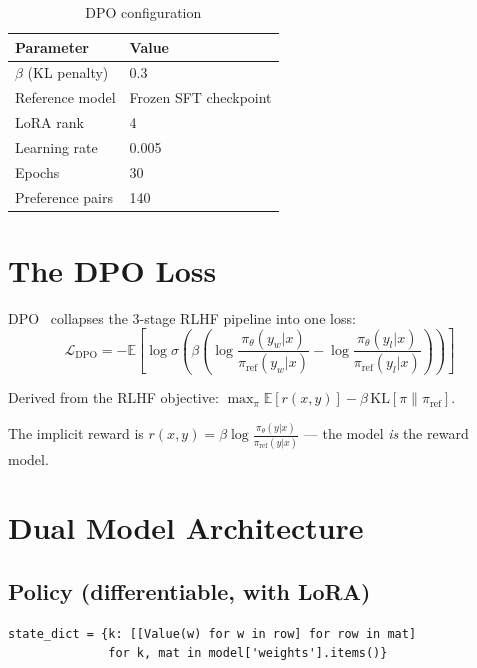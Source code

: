\documentclass[11pt,a4paper]{article}
\begin{document}
\begin{table}[h]
\centering
\begin{tabular}{ll}
\toprule
\textbf{Parameter} & \textbf{Value} \\
\midrule
$\beta$ (KL penalty) & 0.3 \\
Reference model & Frozen SFT checkpoint \\
LoRA rank & 4 \\
Learning rate & 0.005 \\
Epochs & 30 \\
Preference pairs & 140 \\
\bottomrule
\end{tabular}
\caption{DPO configuration}
\end{table}

\section{The DPO Loss}

DPO~\cite{rafailov2023direct} collapses the 3-stage RLHF pipeline into one loss:
\[
\boxed{\mathcal{L}_{\text{DPO}} = -\mathbb{E} \left[ \log \sigma\!\left( \beta \left( \log \frac{\pi_\theta(y_w|x)}{\pi_{\text{ref}}(y_w|x)} - \log \frac{\pi_\theta(y_l|x)}{\pi_{\text{ref}}(y_l|x)} \right) \right) \right]}
\]

Derived from the RLHF objective: $\max_\pi \mathbb{E}[r(x,y)] - \beta\,\text{KL}[\pi \| \pi_{\text{ref}}]$.

The implicit reward is $r(x,y) = \beta \log \frac{\pi_\theta(y|x)}{\pi_{\text{ref}}(y|x)}$ --- the model \textit{is} the reward model.

\section{Dual Model Architecture}

\subsection{Policy (differentiable, with LoRA)}

\begin{lstlisting}[firstnumber=105]
state_dict = {k: [[Value(w) for w in row] for row in mat]
              for k, mat in model['weights'].items()}
\end{lstlisting}
\end{document}
